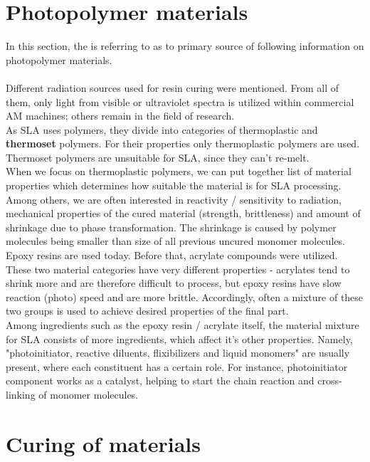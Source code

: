 \documentclass[a4paper, twoside, 11pt]{report}
\begin{document}
\section{Photopolymer materials}
In this section, the \cite{AMT} is referring to \cite{SLAmaterials} as to primary source of following information on photopolymer materials.\\
\\
Different radiation sources used for resin curing were mentioned. From all of them, only light from visible or ultraviolet spectra is utilized within commercial AM machines; others remain in the field of research.\\
As SLA uses polymers, they divide into categories of thermoplastic and \textbf{thermoset} polymers. For their properties only thermoplastic polymers are used. Thermoset polymers are unsuitable for SLA, since they can't re-melt.\\
When we focus on thermoplastic polymers, we can put together list of material properties which determines how suitable the material is for SLA processing. Among others, we are often interested in reactivity / sensitivity to radiation, mechanical properties of the cured material (strength, brittleness) and amount of shrinkage due to phase transformation. The shrinkage is caused  by polymer molecules being smaller than  size of all previous uncured monomer molecules.\\
Epoxy resins are used today. Before that, acrylate compounds were utilized. These two material categories have very different properties - acrylates tend to shrink more and are therefore difficult to process, but epoxy resins have slow reaction (photo) speed and are more brittle. Accordingly, often a mixture of these two groups is used to achieve desired properties of the final part.\\
Among ingredients such as the epoxy resin / acrylate itself, the material mixture for SLA consists of more ingredients, which affect it's other properties. Namely, "photoinitiator, reactive diluents, flixibilizers and liquid monomers" \cite[p. ~67]{AMT} are usually present, where each constituent has a certain role. For instance, photoinitiator component works as a catalyst, helping to start the chain reaction and cross-linking of monomer molecules.
%
%
%
\section{Curing of materials}
%
\end{document}
